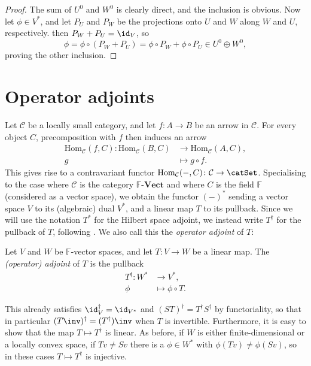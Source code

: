 \documentclass[a4paper, 11pt]{memoir}
\theoremstyle{plaincustomnumber}
\theoremstyle{changedotbreakcustomnumber}
\newcommand{\calC}{\mathcal{C}}
\newcommand{\field}{\mathbb{F}}
\begin{document}
\begin{proof}
    The sum of $U^0$ and $W^0$ is clearly direct, and the inclusion \textquote{$\supseteq$} is obvious. Now let $\phi \in V^*$, and let $P_U$ and $P_W$ be the projections onto $U$ and $W$ along $W$ and $U$, respectively. then $P_W + P_U = \id_V$, so
    \begin{equation*}
        \phi
            = \phi \circ (P_W + P_U)
            = \phi \circ P_W + \phi \circ P_U
            \in U^0 \oplus W^0,
    \end{equation*}
    proving the other inclusion.
\end{proof}


\section{Operator adjoints}\label{sec:operator-adjoints}

\renewcommand{\hom}[1][]{\mathrm{Hom}_{#1}}

\newpar

Let $\calC$ be a locally small category, and let $f \colon A \to B$ be an arrow in $\calC$. For every object $C$, precomposition with $f$ then induces an arrow
%
\begin{align*}
    \hom[\calC](f,C) \colon \hom[\calC](B,C) &\to \hom[\calC](A,C), \\
        g &\mapsto g \circ f.
\end{align*}
%
This gives rise to a contravariant functor $\hom[\calC](-,C) \colon \calC \to \catSet$. Specialising to the case where $\calC$ is the category $\field\text{-}\mathbf{Vect}$ and where $C$ is the field $\field$ (considered as a vector space), we obtain the functor $(-)^*$ sending a vector space $V$ to its (algebraic) dual $V^*$, and a linear map $T$ to its pullback. Since we will use the notation $T^*$ for the Hilbert space adjoint, we instead write $T^\dagger$ for the pullback of $T$, following \textcite{follandrealanalysis}. We also call this the \emph{operator adjoint} of $T$:

\begin{definition}
    Let $V$ and $W$ be $\field$-vector spaces, and let $T \colon V \to W$ be a linear map. The \emph{(operator) adjoint} of $T$ is the pullback
    \begin{align*}
        T^\dagger \colon W^* &\to V^*, \\
        \phi &\mapsto \phi \circ T.
    \end{align*}
\end{definition}
%
This already satisfies $\id_V^\dagger = \id_{V^*}$ and $(ST)^\dagger = T^\dagger S^\dagger$ by functoriality, so that in particular $(T\inv)^\dagger = (T^\dagger)\inv$ when $T$ is invertible. Furthermore, it is easy to show that the map $T \mapsto T^\dagger$ is linear. As before, if $W$ is either finite-dimensional or a locally convex space, if $Tv \neq Sv$ there is a $\phi \in W^*$ with $\phi(Tv) \neq \phi(Sv)$, so in these cases $T \mapsto T^\dagger$ is injective.
\end{document}
